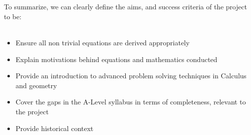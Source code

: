 \documentclass[12pt]{report}
\begin{document}
\\
\\
To summarize, we can clearly define the aims, and success criteria of the project to be:
\\
\\
\begin{itemize}
    \item Ensure all non trivial equations are derived appropriately
    \item Explain motivations behind equations and mathematics conducted
    \item Provide an introduction to advanced problem solving techniques in Calculus and geometry
    \item Cover the gaps in the A-Level syllabus in terms of completeness, relevant to the project
    \item Provide historical context
\end{itemize}
\end{document}
